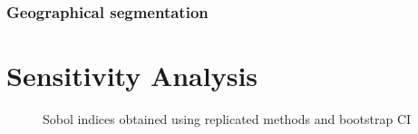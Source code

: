 \documentclass[../../Main_ManuscritThese.tex]{subfiles}
\newcommand\imgpath{/home/victor/acadwriting/Manuscrit/Text/Chapter5/img/}
\begin{document}
\subsubsection{Geographical segmentation}

\section{Sensitivity Analysis}

\begin{figure}[ht]
  \centering
  
  \caption{\label{fig:sobol_indices} Sobol indices obtained using replicated methods and bootstrap CI}
\end{figure}








\subfileLocal{
	\pagestyle{empty}
	
	
}
\end{document}
